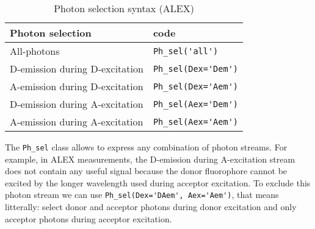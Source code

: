 \begin{table}
\centering
\begin{tabular}{l|l}
  Photon selection  & code \\
  \hline
  All-photons & \verb|Ph_sel('all')|\\
  D-emission during D-excitation & \verb|Ph_sel(Dex='Dem')|\\
  A-emission during D-excitation & \verb|Ph_sel(Dex='Aem')|\\
  D-emission during A-excitation & \verb|Ph_sel(Aex='Dem')|\\
  A-emission during A-excitation & \verb|Ph_sel(Aex='Aem')|\\
\end{tabular}
\caption{\label{tab:ph_sel_alex}Photon selection syntax (ALEX)}
\end{table}

The \verb|Ph_sel| class allows to express any combination of photon streams. For example, in ALEX measurements, the D-emission during A-excitation stream does not contain any useful signal because the donor fluorophore cannot be excited by the longer wavelength used during acceptor excitation. To exclude this photon stream we can use \verb|Ph_sel(Dex='DAem', Aex='Aem')|, that means litterally: select donor and acceptor photons during donor excitation and only acceptor photons during acceptor excitation.